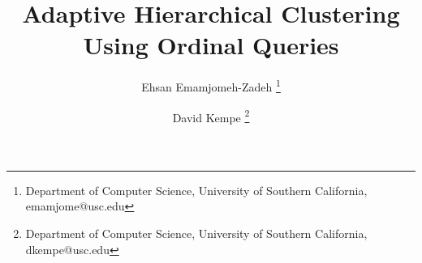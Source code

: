 \documentclass[11pt]{article}
\begin{document}


\title{Adaptive Hierarchical Clustering Using Ordinal Queries}

\author{%
Ehsan Emamjomeh-Zadeh%
\thanks{%
Department of Computer Science,
University of Southern California,
emamjome@usc.edu} 
\and
David Kempe%
\thanks{%
Department of Computer Science,
University of Southern California,
dkempe@usc.edu}
}

\begin{titlepage}

\maketitle

\begin{abstract}

\end{abstract}

\end{titlepage}



















\appendix

%





\end{document}
